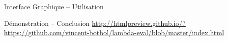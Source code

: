 \documentclass{beamer}
\begin{document}
\begin{frame}{Interface Graphique -- Utilisation}
  
  
\end{frame}

\begin{frame}{Démonstration -- Conclusion}
  \url{http://htmlpreview.github.io/?https://github.com/vincent-botbol/lambda-eval/blob/master/index.html}
\end{frame}
\end{document}

